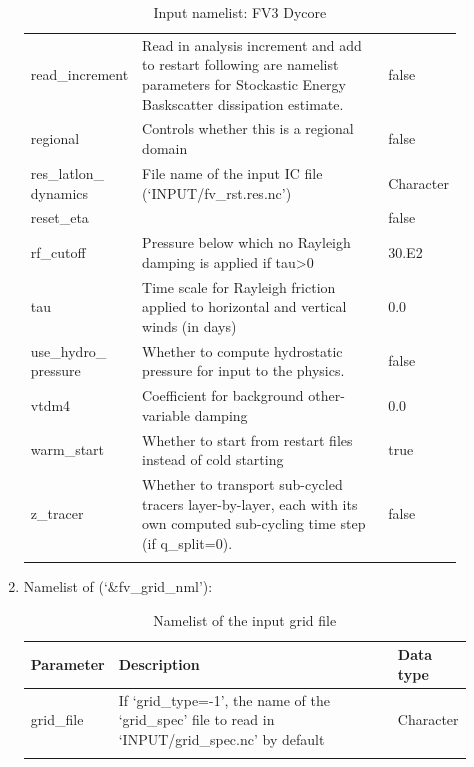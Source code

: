 \documentclass[11pt,fleqn]{report}              %
\begin{document}
\begin{enumerate}
{\begin{longtable}{p{0.13\linewidth} | p{0.69\linewidth} | p{0.08\linewidth} }
 read\_increment & Read in analysis increment and add to restart following are namelist parameters for Stockastic Energy Baskscatter dissipation estimate. & false \\
 regional & Controls whether this is a regional domain & false \\
 res\_latlon\_ dynamics & File name of the input IC file (`INPUT/fv\_rst.res.nc') & Character \\
 reset\_eta & & false \\
 rf\_cutoff & Pressure below which no Rayleigh damping is applied if tau>0 & 30.E2 \\
 tau & Time scale for Rayleigh friction applied to horizontal and vertical winds (in days) & 0.0 \\
 use\_hydro\_ pressure & Whether to compute hydrostatic pressure for input to the physics. & false \\
 vtdm4 & Coefficient for background other-variable damping & 0.0 \\
 warm\_start & Whether to start from restart files instead of cold starting & true \\
 z\_tracer & Whether to transport sub-cycled tracers layer-by-layer, each with its own computed sub-cycling time step (if q\_split=0). & false \\
\hline
\caption{Input namelist: FV3 Dycore}
\label{table:fv3_input_nml_fv_dycore}
\end{longtable}
}

\item Namelist of  (`\&fv\_grid\_nml'):
{
\scriptsize
\begin{longtable}{p{0.08\linewidth} | p{0.76\linewidth} | p{0.08\linewidth} }
\hline
\hline
Parameter & Description & Data type \\
\hline
grid\_file & If `grid\_type=-1', the name of the `grid\_spec' file to read in `INPUT/grid\_spec.nc' by default & Character \\
\hline
\caption{Namelist of the input grid file}
\label{table:fv3_input_nml_grid}
\end{longtable}
}


\end{enumerate}
\end{document}
